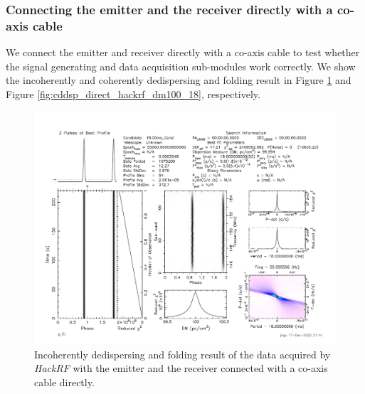 \documentclass[fleqn,usenatbib]{mnras}
\begin{document}
\subsubsection{Connecting the emitter and the receiver directly with a co-axis cable}
We connect the emitter and receiver directly with a co-axis cable to test whether the signal generating and data acquisition sub-modules work correctly.
We show the incoherently and coherently dedispersing and folding result in Figure \ref{fig:prepfold_direct_hackrf_dm100_18} and Figure \ref{fig:cddsp_direct_hackrf_dm100_18}, respectively.

\begin{figure}
    \centering
    \includegraphics[width=\columnwidth]{prepfold_direct_hackrf_dm100_18.pdf}
    \caption{Incoherently dedispersing and folding result of the data acquired by \textit{HackRF} with the emitter and the receiver connected with a co-axis cable directly.}
    \label{fig:prepfold_direct_hackrf_dm100_18}
\end{figure}
\end{document}
